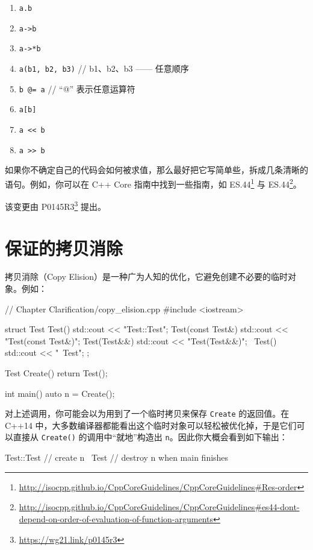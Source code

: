 \begin{enumerate}
\item \texttt{a.b}
\item \texttt{a->b}
\item \texttt{a->*b}
\item \texttt{a(b1, b2, b3)} // b1、b2、b3 —— 任意顺序
\item \texttt{b @= a} // “@” 表示任意运算符
\item \texttt{a[b]}
\item \texttt{a << b}
\item \texttt{a >> b}
\end{enumerate}

如果你不确定自己的代码会如何被求值，那么最好把它写简单些，拆成几条清晰的语句。例如，你可以在 C++ Core 指南中找到一些指南，如 ES.44\footnote{\url{http://isocpp.github.io/CppCoreGuidelines/CppCoreGuidelines\#Res-order}} 与 ES.44\footnote{\url{http://isocpp.github.io/CppCoreGuidelines/CppCoreGuidelines\#es44-dont-depend-on-order-of-evaluation-of-function-arguments}}。

\begin{myInfoBox}
该变更由 P0145R3\footnote{\url{https://wg21.link/p0145r3}} 提出。
\end{myInfoBox}

\section{保证的拷贝消除}

拷贝消除（Copy Elision）是一种广为人知的优化，它避免创建不必要的临时对象。例如：

\begin{codebox}[cpp]
// Chapter Clarification/copy_elision.cpp
#include <iostream>

struct Test
{
    Test() { std::cout << "Test::Test\n"; }
    Test(const Test&) { std::cout << "Test(const Test&)\n"; }
    Test(Test&&) { std::cout << "Test(Test&&)\n"; }
    ~Test() { std::cout << "~Test\n"; }
};

Test Create()
{
    return Test();
}

int main()
{
    auto n = Create();
}
\end{codebox}

对上述调用，你可能会以为用到了一个临时拷贝来保存 \texttt{Create} 的返回值。在 C++14 中，大多数编译器都能看出这个临时对象可以轻松被优化掉，于是它们可以直接从 \texttt{Create()} 的调用中“就地”构造出 \texttt{n}。因此你大概会看到如下输出：

\begin{codebox}
Test::Test // create n
~Test // destroy n when main finishes
\end{codebox}

